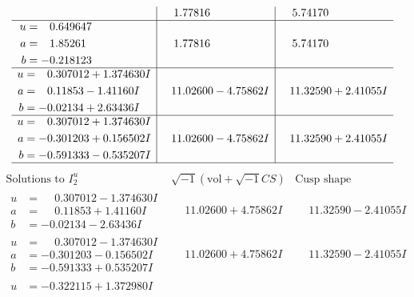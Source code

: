 \documentclass[1p]{elsarticle_modified}
\theoremstyle{definition}
\newcommand{\I}{\sqrt{-1}}
\begin{document}
$$\begin{array}{c|c|c}
 & \phantom{-}1.77816\phantom{ +0.000000I} & \phantom{-}5.74170\phantom{ +0.000000I} \\ \hline\begin{aligned}
u &= \phantom{-}0.649647\phantom{ +0.000000I} \\
a &= \phantom{-}1.85261\phantom{ +0.000000I} \\
b &= -0.218123\phantom{ +0.000000I}\end{aligned}
 & \phantom{-}1.77816\phantom{ +0.000000I} & \phantom{-}5.74170\phantom{ +0.000000I} \\ \hline\begin{aligned}
u &= \phantom{-}0.307012 + 1.374630 I \\
a &= \phantom{-}0.11853 - 1.41160 I \\
b &= -0.02134 + 2.63436 I\end{aligned}
 & \phantom{-}11.02600 - 4.75862 I & \phantom{-}11.32590 + 2.41055 I \\ \hline\begin{aligned}
u &= \phantom{-}0.307012 + 1.374630 I \\
a &= -0.301203 + 0.156502 I \\
b &= -0.591333 - 0.535207 I\end{aligned}
 & \phantom{-}11.02600 - 4.75862 I & \phantom{-}11.32590 + 2.41055 I\\
 \hline 
 \end{array}$$\newpage$$\begin{array}{c|c|c}  
\text{Solutions to }I^u_{2}& \I (\text{vol} + \sqrt{-1}CS) & \text{Cusp shape}\\
 \hline 
\begin{aligned}
u &= \phantom{-}0.307012 - 1.374630 I \\
a &= \phantom{-}0.11853 + 1.41160 I \\
b &= -0.02134 - 2.63436 I\end{aligned}
 & \phantom{-}11.02600 + 4.75862 I & \phantom{-}11.32590 - 2.41055 I \\ \hline\begin{aligned}
u &= \phantom{-}0.307012 - 1.374630 I \\
a &= -0.301203 - 0.156502 I \\
b &= -0.591333 + 0.535207 I\end{aligned}
 & \phantom{-}11.02600 + 4.75862 I & \phantom{-}11.32590 - 2.41055 I \\ \hline\begin{aligned}
u &= -0.322115 + 1.372980 I \\

\end{aligned}
\end{array}$$
\end{document}
